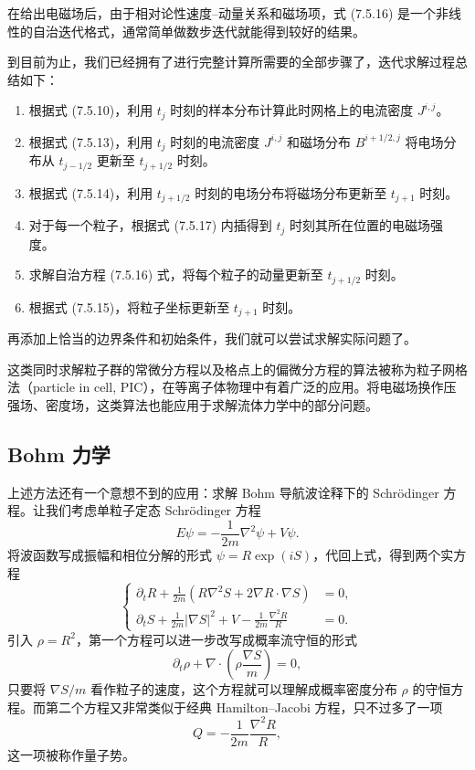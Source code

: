 在给出电磁场后，由于相对论性速度--动量关系和磁场项，式 (7.5.16) 是一个非线性的自治迭代格式，通常简单做数步迭代就能得到较好的结果。

到目前为止，我们已经拥有了进行完整计算所需要的全部步骤了，迭代求解过程总结如下：
\begin{algorithmBox}
\begin{enumerate}[label=\arabic*.,leftmargin=2em]
\item 根据式 (7.5.10)，利用 $t_j$ 时刻的样本分布计算此时网格上的电流密度 $J^{i,j}$。
\item 根据式 (7.5.13)，利用 $t_j$ 时刻的电流密度 $J^{i,j}$ 和磁场分布 $B^{i+1/2,j}$ 将电场分布从 $t_{j-1/2}$ 更新至 $t_{j+1/2}$ 时刻。
\item 根据式 (7.5.14)，利用 $t_{j+1/2}$ 时刻的电场分布将磁场分布更新至 $t_{j+1}$ 时刻。
\item 对于每一个粒子，根据式 (7.5.17) 内插得到 $t_j$ 时刻其所在位置的电磁场强度。
\item 求解自治方程 (7.5.16) 式，将每个粒子的动量更新至 $t_{j+1/2}$ 时刻。
\item 根据式 (7.5.15)，将粒子坐标更新至 $t_{j+1}$ 时刻。
\end{enumerate}
\end{algorithmBox}

再添加上恰当的边界条件和初始条件，我们就可以尝试求解实际问题了。

这类同时求解粒子群的常微分方程以及格点上的偏微分方程的算法被称为粒子网格法（particle in cell, PIC），在等离子体物理中有着广泛的应用。将电磁场换作压强场、密度场，这类算法也能应用于求解流体力学中的部分问题。

\subsection{Bohm 力学}

上述方法还有一个意想不到的应用：求解 Bohm 导航波诠释下的 Schrödinger 方程。让我们考虑单粒子定态 Schrödinger 方程
\begin{equation}
E\psi=-\frac1{2m}\nabla^2\psi+V\psi.
\tag{7.5.18}
\end{equation}
将波函数写成振幅和相位分解的形式 $\psi=R\exp(iS)$，代回上式，得到两个实方程
\begin{equation}
\left\{
\begin{aligned}
\partial_tR+\frac1{2m}(R\nabla^2S+2\nabla R\cdot\nabla S)&=0,\\
\partial_tS+\frac1{2m}|\nabla S|^2+V-\frac1{2m}\frac{\nabla^2R}{R}&=0.
\end{aligned}
\right.
\tag{7.5.19}
\end{equation}
引入 $\rho=R^2$，第一个方程可以进一步改写成概率流守恒的形式
\begin{equation}
\partial_t\rho+\nabla\cdot\left(\rho\frac{\nabla S}{m}\right)=0,
\tag{7.5.20}
\end{equation}
只要将 $\nabla S/m$ 看作粒子的速度，这个方程就可以理解成概率密度分布 $\rho$ 的守恒方程。而第二个方程又非常类似于经典 Hamilton--Jacobi 方程，只不过多了一项
\begin{equation}
Q=-\frac1{2m}\frac{\nabla^2R}{R},
\tag{7.5.21}
\end{equation}
这一项被称作量子势。

